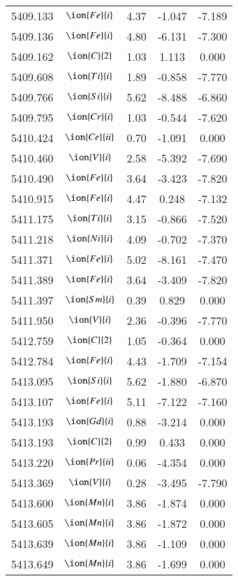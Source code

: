 \documentclass[fleqn,usenatbib]{mnras}
\begin{document}
\begin{center}
\begin{table}
\begin{tabular}{ccccc}
5409.133 &  $\ion{Fe}{i}$  & 4.37 & -1.047 & -7.189 \\ 
5409.136 &  $\ion{Fe}{i}$  & 4.80 & -6.131 & -7.300 \\ 
5409.162 &  $\ion{C}{2}$ & 1.03 & 1.113 & 0.000 \\ 
5409.608 &  $\ion{Ti}{i}$  & 1.89 & -0.858 & -7.770 \\ 
5409.766 &  $\ion{Si}{i}$  & 5.62 & -8.488 & -6.860 \\ 
5409.795 &  $\ion{Cr}{i}$  & 1.03 & -0.544 & -7.620 \\ 
5410.424 &  $\ion{Ce}{ii}$  & 0.70 & -1.091 & 0.000 \\ 
5410.460 &  $\ion{V}{i}$  & 2.58 & -5.392 & -7.690 \\ 
5410.490 &  $\ion{Fe}{i}$  & 3.64 & -3.423 & -7.820 \\ 
5410.915 &  $\ion{Fe}{i}$  & 4.47 & 0.248 & -7.132 \\ 
5411.175 &  $\ion{Ti}{i}$  & 3.15 & -0.866 & -7.520 \\ 
5411.218 &  $\ion{Ni}{i}$  & 4.09 & -0.702 & -7.370 \\ 
5411.371 &  $\ion{Fe}{i}$  & 5.02 & -8.161 & -7.470 \\ 
5411.389 &  $\ion{Fe}{i}$  & 3.64 & -3.409 & -7.820 \\ 
5411.397 &  $\ion{Sm}{i}$  & 0.39 & 0.829 & 0.000 \\ 
5411.950 &  $\ion{V}{i}$  & 2.36 & -0.396 & -7.770 \\ 
5412.759 &  $\ion{C}{2}$ & 1.05 & -0.364 & 0.000 \\ 
5412.784 &  $\ion{Fe}{i}$  & 4.43 & -1.709 & -7.154 \\ 
5413.095 &  $\ion{Si}{i}$  & 5.62 & -1.880 & -6.870 \\ 
5413.107 &  $\ion{Fe}{i}$  & 5.11 & -7.122 & -7.160 \\ 
5413.193 &  $\ion{Gd}{i}$  & 0.88 & -3.214 & 0.000 \\ 
5413.193 &  $\ion{C}{2}$ & 0.99 & 0.433 & 0.000 \\ 
5413.220 &  $\ion{Pr}{ii}$  & 0.06 & -4.354 & 0.000 \\ 
5413.369 &  $\ion{V}{i}$  & 0.28 & -3.495 & -7.790 \\ 
5413.600 &  $\ion{Mn}{i}$  & 3.86 & -1.874 & 0.000 \\ 
5413.605 &  $\ion{Mn}{i}$  & 3.86 & -1.872 & 0.000 \\ 
5413.639 &  $\ion{Mn}{i}$  & 3.86 & -1.109 & 0.000 \\ 
5413.649 &  $\ion{Mn}{i}$  & 3.86 & -1.699 & 0.000 \\ 

\end{tabular}
\end{table}
\end{center}
\end{document}
